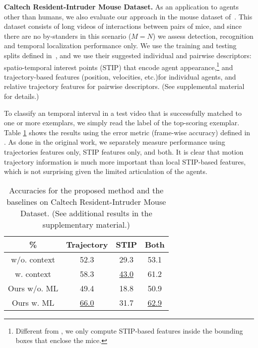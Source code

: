 \vspace{0.05in} \noindent\textbf{Caltech Resident-Intruder Mouse Dataset.} As an application to agents other than humans, we also evaluate our approach in the mouse dataset of~\cite{CRIM13}. This dataset consists of long videos of interactions between pairs of mice, and since there are no by-standers in this scenario (\ie $M=N$) we assess detection, recognition and temporal localization performance only. We use the training and testing splits defined in~\cite{CRIM13}, and we use their suggested individual and pairwise descriptors: spatio-temporal interest points (STIP) that encode agent appearance,\footnote{Different from \cite{CRIM13}, we only compute STIP-based features inside the bounding boxes that enclose the mice.} and trajectory-based features (position, velocities, etc.)for individual agents, and relative trajectory features for pairwise descriptors. (See supplemental material for details.)

To classify an temporal interval in a test video that is successfully matched to one or more exemplars, we simply read the label of the top-scoring exemplar. Table \ref{CRIMAccu} shows the results using the error metric (frame-wise accuracy) defined in \cite{CRIM13}. As done in the original work, we separately measure performance using trajectories features only, STIP features only, and both. It is clear that motion trajectory information is much more important than local STIP-based features, which is not surprising given the limited articulation of the agents.

\begin{table}[h]
\vspace{-5pt}
\centering \caption{Accuracies for the proposed method and the baselines on Caltech Resident-Intruder Mouse Dataset. (See additional results in the supplementary material.)}
\footnotesize{
\begin{tabular}{|c||c|c|c|}
\hline  \% & Trajectory & STIP & Both \\
\hline \cite{CRIM13} w/o. context & 52.3 & 29.3 & 53.1\\
\hline \cite{CRIM13} w. context & 58.3 & \underline{43.0} & 61.2\\
\hline Ours w/o. ML & 49.4 & 18.8 & 50.9 \\
\hline Ours w. ML & \underline{66.0} & 31.7 & \underline{62.9}\\
\hline 
\end{tabular}
}
\label{CRIMAccu}
\vspace{-5pt}
\end{table}

